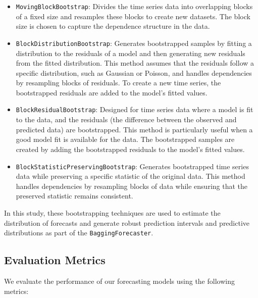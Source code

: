 \begin{itemize}
    \item \texttt{MovingBlockBootstrap}: Divides the time series data into overlapping blocks of a fixed size and resamples these blocks to create new datasets. The block size is chosen to capture the dependence structure in the data.
    \item \texttt{BlockDistributionBootstrap}: Generates bootstrapped samples by fitting a distribution to the residuals of a model and then generating new residuals from the fitted distribution. This method assumes that the residuals follow a specific distribution, such as Gaussian or Poisson, and handles dependencies by resampling blocks of residuals. To create a new time series, the bootstrapped residuals are added to the model's fitted values.
    \item \texttt{BlockResidualBootstrap}: Designed for time series data where a model is fit to the data, and the residuals (the difference between the observed and predicted data) are bootstrapped. This method is particularly useful when a good model fit is available for the data. The bootstrapped samples are created by adding the bootstrapped residuals to the model's fitted values.
    \item \texttt{BlockStatisticPreservingBootstrap}: Generates bootstrapped time series data while preserving a specific statistic of the original data. This method handles dependencies by resampling blocks of data while ensuring that the preserved statistic remains consistent.
\end{itemize}

In this study, these bootstrapping techniques are used to estimate the distribution of forecasts and generate robust prediction intervals and predictive distributions as part of the \texttt{BaggingForecaster}.

\subsection{Evaluation Metrics}
We evaluate the performance of our forecasting models using the following metrics:

